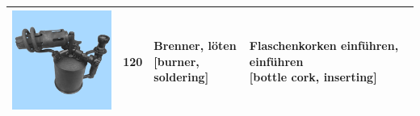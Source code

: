 \documentclass[
  english,
  man,floatsintext]{apa7}
\begin{document}
\begin{center}
\begin{ThreePartTable}
{\begin{longtable}{llll}
\includegraphics[valign=c, scale=0.23]{../materials/unfamiliar/120.png} & 120 & \makecell[l]{Brenner, löten\\{[burner, soldering]}} & \makecell[l]{Flaschenkorken einführen, einführen\\{[bottle cork, inserting]}}\\
\bottomrule
\end{longtable}

}

\end{ThreePartTable}
\end{center}
\end{document}

